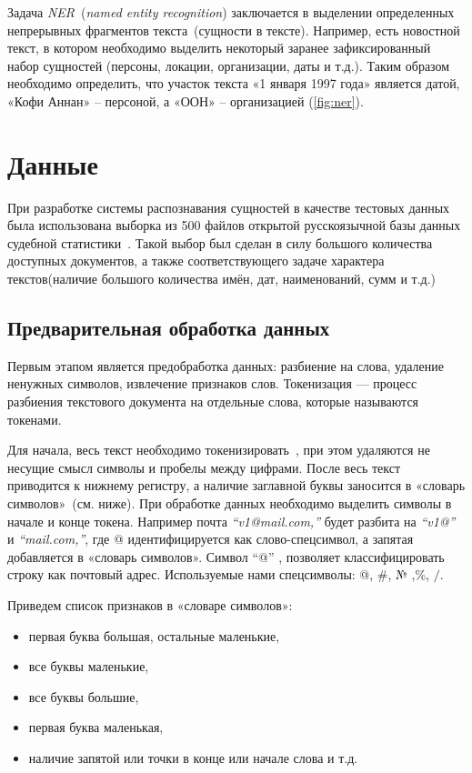 \documentclass{csmathnotes}
\begin{document}
Задача \emph{NER}~(\emph{named entity recognition}) заключается в выделении определенных непрерывных фрагментов текста~(сущности в тексте). Например, есть новостной текст, в котором необходимо выделить некоторый заранее зафиксированный набор сущностей (персоны, локации, организации, даты и т.д.). Таким образом необходимо определить, что участок текста «1 января 1997 года» является датой, «Кофи Аннан» – персоной, а «ООН» – организацией (\ref{fig:ner}). 

\section*{Данные}
При разработке системы распознавания сущностей в качестве тестовых данных была использована выборка из 500 файлов открытой русскоязычной базы данных судебной статистики~\cite{CourtsData}. Такой выбор был сделан в силу большого количества доступных документов, а также соответствующего задаче характера текстов(наличие большого количества имён, дат, наименований, сумм и т.д.)

\subsection*{Предварительная обработка данных}
Первым этапом является предобработка данных: разбиение на слова, удаление ненужных символов, извлечение признаков слов. 
Токенизация — процесс разбиения текстового документа на отдельные слова, которые называются токенами.


Для начала, весь текст необходимо токенизировать~\cite{Ner}, при этом удаляются не несущие смысл символы и пробелы между цифрами. После весь текст приводится к нижнему регистру, а наличие заглавной буквы заносится в «словарь символов»~(см. ниже).
При обработке данных необходимо выделить символы в начале и конце токена.  Например почта \emph{“v1@mail.com,”} будет разбита на \emph{“v1@”} и \emph{“mail.com,”}, где @ идентифицируется как слово-спецсимвол, а запятая добавляется в «словарь символов». Символ “@” , позволяет классифицировать строку как почтовый адрес. Используемые нами спецсимволы: @, \#, № ,\%, $/$.


Приведем список признаков в «словаре символов»:
\begin{itemize}
    \item первая буква большая, остальные маленькие,
    \item все буквы маленькие,
    \item все буквы большие,
    \item первая буква маленькая,
    \item наличие запятой или точки в конце или начале слова и т.д.
\end{itemize}
\end{document}
